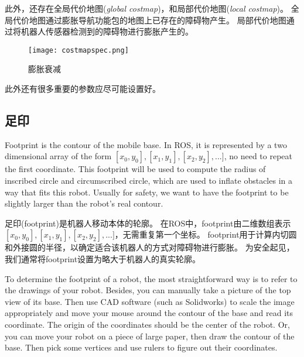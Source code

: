 
此外，还存在全局代价地图(\textit{global costmap})，和局部代价地图(\textit{local costmap})。
全局代价地图通过膨胀导航功能包的地图上已存在的障碍物产生。
局部代价地图通过将机器人传感器检测到的障碍物进行膨胀产生的。

\begin{figure}[!h]
	\texttt{[image: costmapspec.png]}
	\caption{膨胀衰减}
\end{figure}

\noindent 此外还有很多重要的参数应尽可能设置好。

\subsection[footprint]{足印}%
Footprint is the contour of the mobile base. In ROS, it is represented by a two dimensional array of the form $[x_0, y_0],[x_1,y_1],[x_2,y_2],...]$, no need to repeat the first coordinate. This footprint will be used to compute the radius of inscribed circle and circumscribed circle, which are used to inflate obstacles in a way that fits this robot. Usually for safety, we want to have the footprint to be slightly larger than the robot's real contour.

足印(footprint)是机器人移动本体的轮廓。
在ROS中，footprint由二维数组表示 $[x_0, y_0], [x_1,y_1], [x_2,y_2], ...]$，无需重复第一个坐标。
footprint用于计算内切圆和外接圆的半径，以确定适合该机器人的方式对障碍物进行膨胀。
为安全起见，我们通常将footprint设置为略大于机器人的真实轮廓。

To determine the footprint of a robot, the most straightforward way is to refer to the drawings of your robot. Besides, you can manually take a picture of the top view of its base. Then use CAD software (such as Solidworks) to scale the image appropriately and move your mouse around the contour of the base and read its coordinate. The origin of the coordinates should be the center of the robot. Or, you can move your robot on a piece of large paper, then draw the contour of the base. Then pick some vertices and use rulers to figure out their coordinates.

